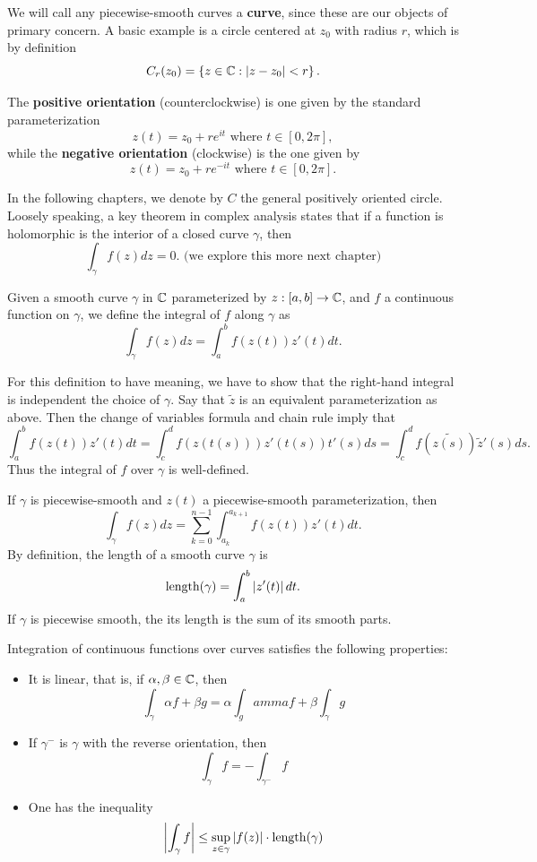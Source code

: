 \documentclass{exam}
\begin{document}
We will call any piecewise-smooth curves a \textbf{curve}, since these are our objects of primary concern. A basic example is a circle
centered at $z_0$ with radius $r$, which is by definition
$$C_r(z_0) = \left \{ z\in\mathbb{C} : |z - z_0| < r \right \}.$$

The \textbf{positive orientation} (counterclockwise) is one given by the standard parameterization
$$z(t) = z_0 + re^{it}\text{ where } t\in[0, 2\pi],$$
while the \textbf{negative orientation} (clockwise) is the one given by 
$$z(t) = z_0 + re^{-it}\text{ where } t\in[0, 2\pi].$$

In the following chapters, we denote by $C$ the general positively oriented circle. Loosely speaking, a key theorem in complex analysis
states that if a function is holomorphic is the interior of a closed curve $\gamma$, then
$$\int_\gamma f(z) dz = 0. \text{ (we explore this more next chapter)}$$

Given a smooth curve $\gamma$ in $\mathbb{C}$ parameterized by $z: [a, b]\to \mathbb{C}$, and $f$ a continuous function on $\gamma$, we define the integral
of $f$ along $\gamma$ as
$$\int_\gamma f(z)dz = \int_a^b f(z(t))z'(t)dt.$$

For this definition to have meaning, we have to show that the right-hand integral is independent the choice of $\gamma$. Say that $\tilde{z}$
is an equivalent parameterization as above. Then the change of variables formula and chain rule imply that
$$\int_a^b f(z(t))z'(t)dt = \int_c^d f(z(t(s)))z'(t(s))t'(s)ds = \int_c^d f(\tilde{z(s)})\tilde{z}'(s)ds.$$
Thus the integral of $f$ over $\gamma$ is well-defined.

If $\gamma$ is piecewise-smooth and $z(t)$ a piecewise-smooth parameterization, then
$$\int_\gamma f(z) dz = \sum_{k = 0}^{n - 1}\int_{a_k}^{a_{k + 1}} f(z(t))z'(t)dt. $$
By definition, the length of a smooth curve $\gamma$ is 
$$\text{length}(\gamma) = \int_a^b \left| z'(t) \right|dt. $$
If $\gamma$ is piecewise smooth, the its length is the sum of its smooth parts.

\noqed
\begin{proposition}
    Integration of continuous functions over curves satisfies the following properties:
    \begin{itemize}
        \item It is linear, that is, if $\alpha, \beta\in\mathbb{C}$, then
        $$\int_\gamma \alpha f + \beta g = \alpha \int_gamma f + \beta \int_\gamma g$$

        \item If $\gamma^-$ is $\gamma$ with the reverse orientation, then
        $$\int_\gamma f = -\int_{\gamma^-} f$$

        \item One has the inequality
        $$\left| \int_\gamma f \right| \leq \sup_{z\in\gamma} \left| f(z) \right|\cdot\text{length}(\gamma)$$
    \end{itemize}
\end{proposition}
\yesqed
\end{document}
